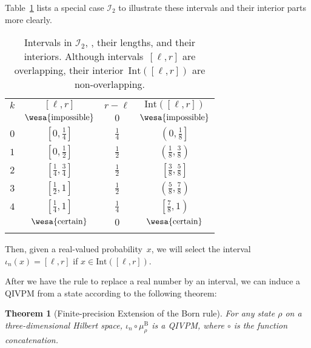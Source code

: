 \documentclass[english,reprint, aps, prl,superscriptaddress, showpacs,
showkeys, longbibliography, amsmath, amssymb, floatfix]{revtex4-1}
\theoremstyle{plain}
\newtheorem{thm}{Theorem}
\theoremstyle{definition}
\newcommand{\imposs}{{\text{\wesa{impossible}}}}
\newcommand{\necess}{{\text{\wesa{certain}}}}
\begin{document}
 Table~\ref{tab:I_2} lists a special case $\mathscr{I}_{2}$ to
illustrate these intervals and their interior parts more clearly.
\begin{table}
\caption{\label{tab:I_2}Intervals in $\mathscr{I}_{2}$, , their lengths,
and their interiors. Although intervals~$[\ell,r]$ are overlapping,
their interior~$\textrm{Int}\left([\ell,r]\right)$ are non-overlapping.}

\begin{tabular}{cccc}
\toprule 
\addlinespace
$k$ & $[\ell,r]$ & $r-\ell$ & $\textrm{Int}\left([\ell,r]\right)$\tabularnewline\addlinespace
\midrule
\midrule 
\addlinespace
 & $\imposs$ & $0$ & $\imposs$\tabularnewline\addlinespace
\midrule 
\addlinespace
$0$ & $\left[0,\tfrac{1}{4}\right]$ & $\tfrac{1}{4}$ & $\left(0,\tfrac{1}{8}\right]$\tabularnewline\addlinespace
\midrule 
\addlinespace
$1$ & $\left[0,{\textstyle \tfrac{1}{2}}\right]$ & $\tfrac{1}{2}$ & $\left(\tfrac{1}{8},\tfrac{3}{8}\right)$\tabularnewline\addlinespace
\midrule 
\addlinespace
$2$ & $\left[\tfrac{1}{4},\tfrac{3}{4}\right]$ & $\tfrac{1}{2}$ & $\left[\tfrac{3}{8},\tfrac{5}{8}\right]$\tabularnewline\addlinespace
\midrule 
\addlinespace
$3$ & $\left[\tfrac{1}{2},1\right]$ & $\tfrac{1}{2}$ & $\left(\tfrac{5}{8},\tfrac{7}{8}\right)$\tabularnewline\addlinespace
\midrule 
\addlinespace
$4$ & $\left[\tfrac{1}{4},1\right]$ & $\tfrac{1}{4}$ & $\left[\tfrac{7}{8},1\right)$\tabularnewline\addlinespace
\midrule 
\addlinespace
 & $\necess$ & $0$ & $\necess$\tabularnewline\addlinespace
\bottomrule
\end{tabular}
\end{table}
 Then, given a real-valued probability~$x$, we will select the interval~$\iota_{n}\left(x\right)=[\ell,r]$
if $x\in\textrm{Int}\left([\ell,r]\right)$.

After we have the rule to replace a real number by an interval, we
can induce a QIVPM from a state according to the following theorem:

\begin{thm}[Finite-precision Extension of the Born rule]\label{thm:Finite-precision-Born}For
any state $\rho$ on a three-dimensional Hilbert space, $\iota_{n}\circ\mu_{\rho}^{\mathrm{B}}$
is a QIVPM, where $\circ$ is the function concatenation.\end{thm}
\end{document}
